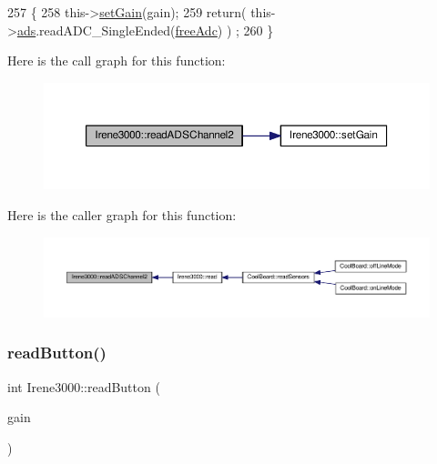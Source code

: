 \begin{DoxyCode}
257 \{   
258     this->\hyperlink{classIrene3000_aff7c5da186b388e7272e63ff88a20c34}{setGain}(gain);
259     \textcolor{keywordflow}{return}( this->\hyperlink{classIrene3000_a1215e77ba761c9908d80d691f149e135}{ads}.readADC\_SingleEnded(\hyperlink{Irene3000_8h_a55497513af255250e464ed76543d46d7}{freeAdc}) ) ;
260 \}
\end{DoxyCode}
Here is the call graph for this function\+:
\nopagebreak
\begin{figure}[H]
\begin{center}
\leavevmode
\includegraphics[width=350pt]{classIrene3000_ae73bd2ed14a199a7e83f4d6458476a7c_cgraph}
\end{center}
\end{figure}
Here is the caller graph for this function\+:
\nopagebreak
\begin{figure}[H]
\begin{center}
\leavevmode
\includegraphics[width=350pt]{classIrene3000_ae73bd2ed14a199a7e83f4d6458476a7c_icgraph}
\end{center}
\end{figure}
\mbox{\label{classIrene3000_ae0e0a5b773c3625b44c1d113c76a1540}} 
\subsubsection{\texorpdfstring{read\+Button()}{readButton()}}
{\footnotesize\ttfamily int Irene3000\+::read\+Button (\begin{DoxyParamCaption}\item[{ads\+Gain\+\_\+t}]{gain }\end{DoxyParamCaption})}

